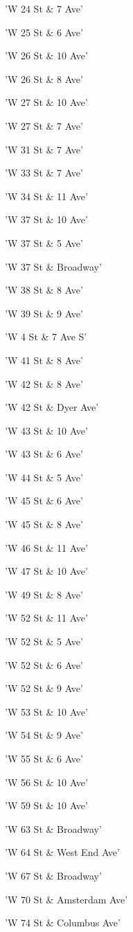 \documentclass[11pt]{article}
\begin{document}
\begin{enumerate*}
\item 'W 24 St \& 7 Ave'
\item 'W 25 St \& 6 Ave'
\item 'W 26 St \& 10 Ave'
\item 'W 26 St \& 8 Ave'
\item 'W 27 St \& 10 Ave'
\item 'W 27 St \& 7 Ave'
\item 'W 31 St \& 7 Ave'
\item 'W 33 St \& 7 Ave'
\item 'W 34 St \& 11 Ave'
\item 'W 37 St \& 10 Ave'
\item 'W 37 St \& 5 Ave'
\item 'W 37 St \& Broadway'
\item 'W 38 St \& 8 Ave'
\item 'W 39 St \& 9 Ave'
\item 'W 4 St \& 7 Ave S'
\item 'W 41 St \& 8 Ave'
\item 'W 42 St \& 8 Ave'
\item 'W 42 St \& Dyer Ave'
\item 'W 43 St \& 10 Ave'
\item 'W 43 St \& 6 Ave'
\item 'W 44 St \& 5 Ave'
\item 'W 45 St \& 6 Ave'
\item 'W 45 St \& 8 Ave'
\item 'W 46 St \& 11 Ave'
\item 'W 47 St \& 10 Ave'
\item 'W 49 St \& 8 Ave'
\item 'W 52 St \& 11 Ave'
\item 'W 52 St \& 5 Ave'
\item 'W 52 St \& 6 Ave'
\item 'W 52 St \& 9 Ave'
\item 'W 53 St \& 10 Ave'
\item 'W 54 St \& 9 Ave'
\item 'W 55 St \& 6 Ave'
\item 'W 56 St \& 10 Ave'
\item 'W 59 St \& 10 Ave'
\item 'W 63 St \& Broadway'
\item 'W 64 St \& West End Ave'
\item 'W 67 St \& Broadway'
\item 'W 70 St \& Amsterdam Ave'
\item 'W 74 St \& Columbus Ave'

\end{enumerate*}
\end{document}
